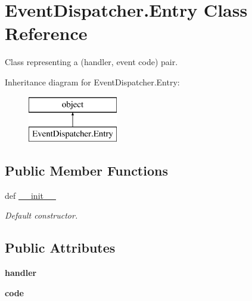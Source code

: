 \hypertarget{class_event_dispatcher_1_1_entry}{\section{Event\-Dispatcher.\-Entry Class Reference}
\label{class_event_dispatcher_1_1_entry}
}


Class representing a (handler, event code) pair.  


Inheritance diagram for Event\-Dispatcher.\-Entry\-:\begin{figure}[H]
\begin{center}
\leavevmode
\includegraphics[height=2.000000cm]{class_event_dispatcher_1_1_entry}
\end{center}
\end{figure}
\subsection*{Public Member Functions}
\begin{DoxyCompactItemize}
\item 
\hypertarget{class_event_dispatcher_1_1_entry_ac1a11d896e644420b9fb175c6ff284bc}{def \hyperlink{class_event_dispatcher_1_1_entry_ac1a11d896e644420b9fb175c6ff284bc}{\-\_\-\-\_\-init\-\_\-\-\_\-}}\label{class_event_dispatcher_1_1_entry_ac1a11d896e644420b9fb175c6ff284bc}

\begin{DoxyCompactList}\small\item\em Default constructor. \end{DoxyCompactList}\end{DoxyCompactItemize}
\subsection*{Public Attributes}
\begin{DoxyCompactItemize}
\item 
\hypertarget{class_event_dispatcher_1_1_entry_ae7db320cec210a771ec6b058e12b336b}{{\bfseries handler}}\label{class_event_dispatcher_1_1_entry_ae7db320cec210a771ec6b058e12b336b}

\item 
\hypertarget{class_event_dispatcher_1_1_entry_a8c2ab6901f00ec0edc1256d37be91630}{{\bfseries code}}\label{class_event_dispatcher_1_1_entry_a8c2ab6901f00ec0edc1256d37be91630}

\end{DoxyCompactItemize}


